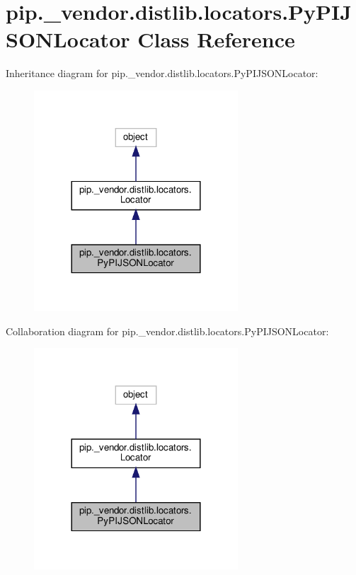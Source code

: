\hypertarget{classpip_1_1__vendor_1_1distlib_1_1locators_1_1PyPIJSONLocator}{}\section{pip.\+\_\+vendor.\+distlib.\+locators.\+Py\+P\+I\+J\+S\+O\+N\+Locator Class Reference}
\label{classpip_1_1__vendor_1_1distlib_1_1locators_1_1PyPIJSONLocator}


Inheritance diagram for pip.\+\_\+vendor.\+distlib.\+locators.\+Py\+P\+I\+J\+S\+O\+N\+Locator\+:
\nopagebreak
\begin{figure}[H]
\begin{center}
\leavevmode
\includegraphics[width=216pt]{classpip_1_1__vendor_1_1distlib_1_1locators_1_1PyPIJSONLocator__inherit__graph}
\end{center}
\end{figure}


Collaboration diagram for pip.\+\_\+vendor.\+distlib.\+locators.\+Py\+P\+I\+J\+S\+O\+N\+Locator\+:
\nopagebreak
\begin{figure}[H]
\begin{center}
\leavevmode
\includegraphics[width=216pt]{classpip_1_1__vendor_1_1distlib_1_1locators_1_1PyPIJSONLocator__coll__graph}
\end{center}
\end{figure}
